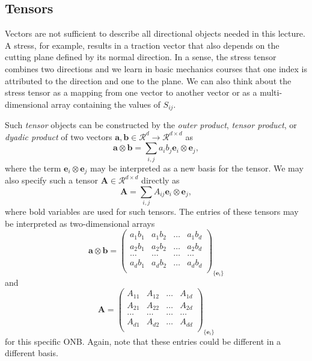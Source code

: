\subsection{Tensors}
Vectors are not sufficient to describe all directional objects needed in this lecture. A stress, for example, results in a traction vector that also depends on the cutting plane defined by its normal direction. 
In a sense, the stress tensor combines two directions and we learn in basic mechanics courses that one index is attributed to the direction and one to the plane. We can also think about the stress tensor as a mapping from one vector to another vector or as a multi-dimensional array containing the values of $S_{ij}$.

Such \emph{tensor} objects can be constructed by the \emph{outer product}, \emph{tensor product}, or \emph{dyadic product} of two vectors $\mathbf{a}, \mathbf{b} \in \mathcal{R}^d \rightarrow \mathcal{R}^{d \times d}$ as 
\begin{equation}
    \label{eq:tensorproduct}
    \mathbf{a} \otimes \mathbf{b} = \sum_{i,j} a_i b_j \mathbf{e}_i \otimes \mathbf{e}_j,
\end{equation}
where the term $\mathbf{e}_i \otimes \mathbf{e}_j$ may be interpreted as a new basis for the tensor. We may also specify such a tensor $\mathbf{A} \in \mathcal{R}^{d \times d}$ directly as 
\begin{equation}
    \mathbf{A} = \sum_{i,j} A_{ij} \mathbf{e}_i \otimes \mathbf{e}_j ,
\end{equation}
where bold variables are used for such tensors.
The entries of these tensors may be interpreted as two-dimensional arrays
\begin{equation}
    \mathbf{a} \otimes \mathbf{b} =
    \begin{pmatrix}
         a_1 b_1    & a_1 b_2   & \dots   & a_1 b_d  \\
         a_2 b_1    & a_2 b_2   & \dots   & a_2 b_d  \\
         \dots      & \dots     & \dots   & \dots  \\
         a_d b_1    & a_d b_2   & \dots   & a_d b_d  \\
    \end{pmatrix}_{\{\mathbf{e}_i\}}
\end{equation}
and 
\begin{equation}
    \mathbf{A} =
    \begin{pmatrix}
         A_{11}    & A_{12}   & \dots   & A_{1d}  \\
         A_{21}    & A_{22}   & \dots   & A_{2d}  \\
         \dots      & \dots     & \dots   & \dots  \\
         A_{d1}    & A_{d2}   & \dots   & A_{dd}  \\
    \end{pmatrix}_{\{\mathbf{e}_i\}}
\end{equation}
for this specific ONB. Again, note that these entries could be different in a different basis.


